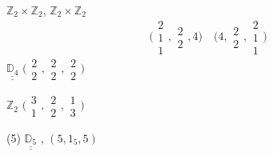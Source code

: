 \documentclass[11pt,a4paper]{article}
\begin{document}
 \quad $\mathbb{Z}_2 \times \mathbb{Z}_2$, $\mathbb{Z}_2 \times \mathbb{Z}_2$
\[
  \bigl(\begin{smallmatrix}2\\1\\1\end{smallmatrix}, \begin{smallmatrix}2\\2\end{smallmatrix}, 4\bigr) \quad
  \bigl(4, \begin{smallmatrix}2\\2\end{smallmatrix}, \begin{smallmatrix}2\\1\\1\end{smallmatrix}\bigr)
\]
 \quad $\underline{\underline{\mathbb{D}_4}}$ \quad $\bigl(\begin{smallmatrix}2\\2\end{smallmatrix}, \begin{smallmatrix}2\\2\end{smallmatrix}, \begin{smallmatrix}2\\2\end{smallmatrix}\bigr)$

 \quad $\mathbb{Z}_2$ \quad $\bigl(\begin{smallmatrix}3\\1\end{smallmatrix}, \begin{smallmatrix}2\\2\end{smallmatrix}, \begin{smallmatrix}1\\3\end{smallmatrix}\bigr)$

(5)
 \quad $\underline{\underline{\mathbb{D}_5}}$ \quad \struck{\ill{}}, $(5, 1_5, 5)$
\end{document}
